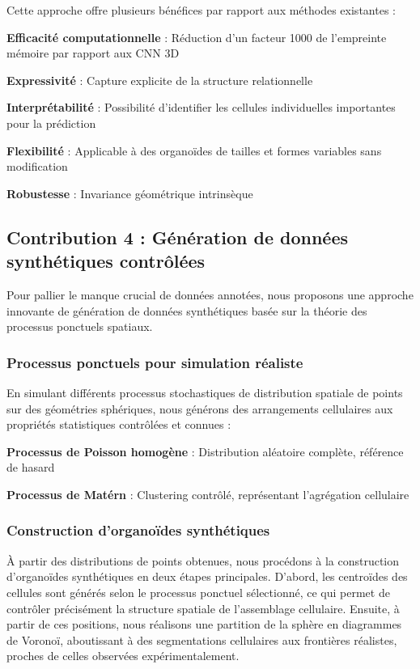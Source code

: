 Cette approche offre plusieurs bénéfices par rapport aux méthodes existantes :

\textbf{Efficacité computationnelle} : Réduction d'un facteur 1000 de l'empreinte mémoire par rapport aux CNN 3D

\textbf{Expressivité} : Capture explicite de la structure relationnelle

\textbf{Interprétabilité} : Possibilité d'identifier les cellules individuelles importantes pour la prédiction

\textbf{Flexibilité} : Applicable à des organoïdes de tailles et formes variables sans modification

\textbf{Robustesse} : Invariance géométrique intrinsèque

\subsection{Contribution 4 : Génération de données synthétiques contrôlées}

Pour pallier le manque crucial de données annotées, nous proposons une approche innovante de génération de données synthétiques basée sur la théorie des processus ponctuels spatiaux.

\subsubsection{Processus ponctuels pour simulation réaliste}

En simulant différents processus stochastiques de distribution spatiale de points~\cite{Illian2008,Diggle2013} sur des géométries sphériques, nous générons des arrangements cellulaires aux propriétés statistiques contrôlées et connues :

\textbf{Processus de Poisson homogène} : Distribution aléatoire complète, référence de hasard

\textbf{Processus de Matérn} : Clustering contrôlé, représentant l'agrégation cellulaire

\subsubsection{Construction d'organoïdes synthétiques}

À partir des distributions de points obtenues, nous procédons à la construction d’organoïdes synthétiques en deux étapes principales. D’abord, les centroïdes des cellules sont générés selon le processus ponctuel sélectionné, ce qui permet de contrôler précisément la structure spatiale de l’assemblage cellulaire. Ensuite, à partir de ces positions, nous réalisons une partition de la sphère en diagrammes de Voronoï, aboutissant à des segmentations cellulaires aux frontières réalistes, proches de celles observées expérimentalement.

